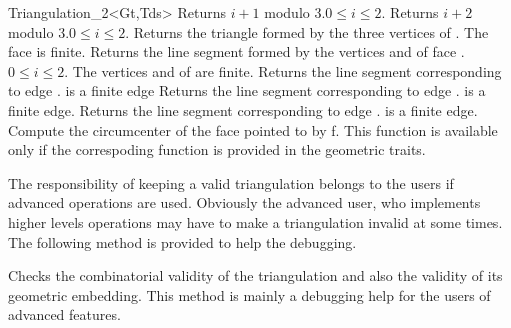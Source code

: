 \begin{ccClassTemplate}{Triangulation_2<Gt,Tds>}
{Returns $i+1$ modulo 3.\ccPrecond $0\leq i \leq 2$.}
\ccGlue
{}
{Returns $i+2$ modulo 3.\ccPrecond $0\leq i \leq 2$.}
\ccGlue
{}
{Returns the triangle formed by the three vertices of .
 \ccPrecond The face is finite.}
\ccGlue
{}
{Returns the line segment formed by the vertices 
 and  of face .
\ccPrecond $0\leq i \leq 2$. The vertices 
 and  of  
 are finite.}
\ccGlue
{}
{Returns the line segment corresponding to edge .
\ccPrecond {} is a finite edge}
\ccGlue
{}
{Returns the line segment corresponding to edge .
\ccPrecond {} is a finite edge.}
\ccGlue
{}
{Returns the line segment corresponding to edge .
\ccPrecond {} is a finite edge.}
\ccGlue
{}
{Compute the circumcenter of the face pointed to by f. This function
is available only if the correspoding function is provided in the
geometric traits.}

\begin{ccAdvanced}

\ccGlue
{}
\ccGlue
{}

The responsibility of keeping a valid triangulation
belongs to the users if advanced operations are used.
Obviously the advanced user, who implements higher levels operations
may have to make a triangulation invalid at some times. The following
method is provided to help the debugging.

{Checks the combinatorial validity of the triangulation and
also the validity of its geometric embedding.
 This method is  mainly a debugging help
for the users of advanced features.
}
\end{ccAdvanced}




\end{ccClassTemplate}
